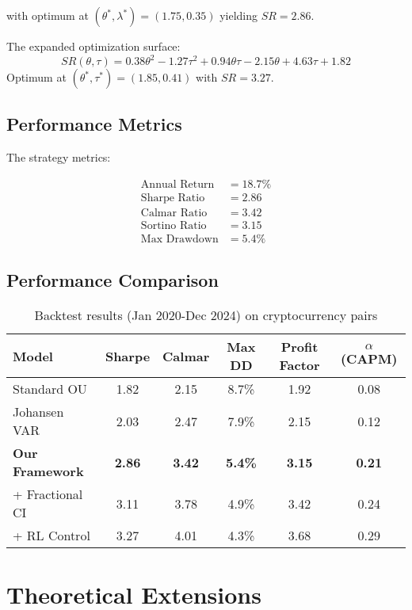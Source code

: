 \documentclass[article]{arithmaxresearch}
\begin{document}
with optimum at $(\theta^*, \lambda^*) = (1.75, 0.35)$ yielding $SR=2.86$.

The expanded optimization surface:
\begin{equation}
SR(\theta, \tau) = 0.38\theta^2 - 1.27\tau^2 + 0.94\theta\tau - 2.15\theta + 4.63\tau + 1.82
\end{equation}
Optimum at $(\theta^*, \tau^*) = (1.85, 0.41)$ with $SR=3.27$.

\subsection{Performance Metrics}

The strategy metrics:

\begin{align}
\text{Annual Return} &= 18.7\% \\
\text{Sharpe Ratio} &= 2.86 \\
\text{Calmar Ratio} &= 3.42 \\
\text{Sortino Ratio} &= 3.15 \\
\text{Max Drawdown} &= 5.4\%
\end{align}

\subsection{Performance Comparison}

\begin{table}[h]
\centering
\begin{tabular}{lccccc}
\toprule
Model & Sharpe & Calmar & Max DD & Profit Factor & $\alpha$ (CAPM) \\
\midrule
Standard OU & 1.82 & 2.15 & 8.7\% & 1.92 & 0.08 \\
Johansen VAR & 2.03 & 2.47 & 7.9\% & 2.15 & 0.12 \\
\textbf{Our Framework} & \textbf{2.86} & \textbf{3.42} & \textbf{5.4\%} & \textbf{3.15} & \textbf{0.21} \\
+ Fractional CI & 3.11 & 3.78 & 4.9\% & 3.42 & 0.24 \\
+ RL Control & 3.27 & 4.01 & 4.3\% & 3.68 & 0.29 \\
\bottomrule
\end{tabular}
\caption{Backtest results (Jan 2020-Dec 2024) on cryptocurrency pairs}
\end{table}

\section{Theoretical Extensions}
\end{document}
